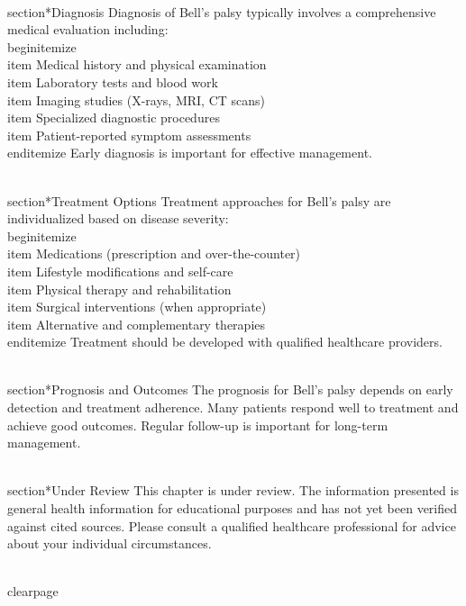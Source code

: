 \\section*{Diagnosis}
Diagnosis of Bell's palsy typically involves a comprehensive medical evaluation including:
\\begin{itemize}
  \\item Medical history and physical examination
  \\item Laboratory tests and blood work
  \\item Imaging studies (X-rays, MRI, CT scans)
  \\item Specialized diagnostic procedures
  \\item Patient-reported symptom assessments
\\end{itemize}
Early diagnosis is important for effective management.

\\section*{Treatment Options}
Treatment approaches for Bell's palsy are individualized based on disease severity:
\\begin{itemize}
  \\item Medications (prescription and over-the-counter)
  \\item Lifestyle modifications and self-care
  \\item Physical therapy and rehabilitation
  \\item Surgical interventions (when appropriate)
  \\item Alternative and complementary therapies
\\end{itemize}
Treatment should be developed with qualified healthcare providers.

\\section*{Prognosis and Outcomes}
The prognosis for Bell's palsy depends on early detection and treatment adherence. Many patients respond well to treatment and achieve good outcomes. Regular follow-up is important for long-term management.

\\section*{Under Review}
This chapter is under review. The information presented is general health information for educational purposes and has not yet been verified against cited sources. Please consult a qualified healthcare professional for advice about your individual circumstances.

\\clearpage
